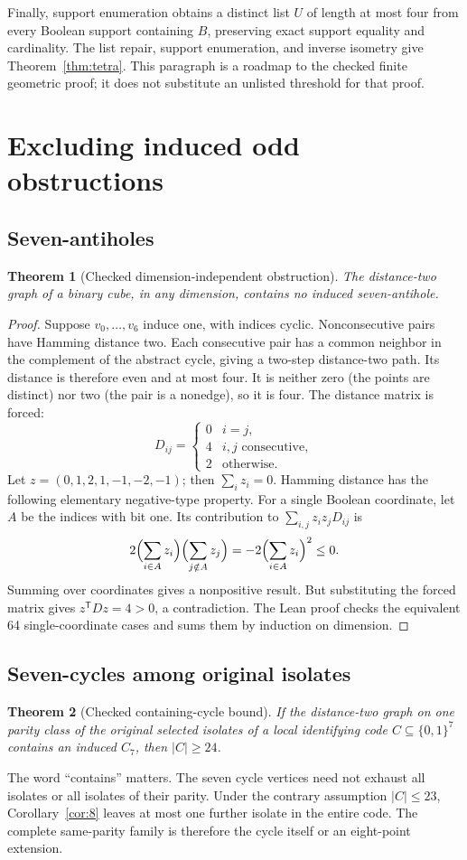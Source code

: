 \documentclass[11pt]{article}
\newtheorem{theorem}{Theorem}[section]
\theoremstyle{definition}\newtheorem{definition}[theorem]{Definition}
\theoremstyle{remark}\newtheorem{remark}[theorem]{Remark}
\newcommand{\card}[1]{\lvert #1\rvert}
\newcommand{\bits}{\{0,1\}}
\begin{document}
Finally, support enumeration obtains a distinct list $U$ of length at most four from every Boolean support containing $B$, preserving exact support equality and cardinality. The list repair, support enumeration, and inverse isometry give Theorem~\ref{thm:tetra}. This paragraph is a roadmap to the checked finite geometric proof; it does not substitute an unlisted threshold for that proof.

\section{Excluding induced odd obstructions}
\subsection{Seven-antiholes}
\begin{theorem}[Checked dimension-independent obstruction]\label{thm:anti}
The distance-two graph of a binary cube, in any dimension, contains no induced seven-antihole.
\end{theorem}
\begin{proof}
Suppose $v_0,\ldots,v_6$ induce one, with indices cyclic. Nonconsecutive pairs have Hamming distance two. Each consecutive pair has a common neighbor in the complement of the abstract cycle, giving a two-step distance-two path. Its distance is therefore even and at most four. It is neither zero (the points are distinct) nor two (the pair is a nonedge), so it is four. The distance matrix is forced:
\[
 D_{ij}=\begin{cases}0&i=j,\\4&i,j\text{ consecutive},\\2&\text{otherwise}.
 \end{cases}
\]
Let $z=(0,1,2,1,-1,-2,-1)$; then $\sum_i z_i=0$. Hamming distance has the following elementary negative-type property. For a single Boolean coordinate, let $A$ be the indices with bit one. Its contribution to $\sum_{i,j}z_i z_jD_{ij}$ is
\[
 2\Bigl(\sum_{i\in A}z_i\Bigr)\Bigl(\sum_{j\notin A}z_j\Bigr)
 =-2\Bigl(\sum_{i\in A}z_i\Bigr)^2\le0.
\]
Summing over coordinates gives a nonpositive result. But substituting the forced matrix gives $z^{\mathsf T}Dz=4>0$, a contradiction. The Lean proof checks the equivalent 64 single-coordinate cases and sums them by induction on dimension.
\end{proof}

\subsection{Seven-cycles among original isolates}
\begin{theorem}[Checked containing-cycle bound]\label{thm:c7}
If the distance-two graph on one parity class of the original selected isolates of a local identifying code $C\subseteq\bits^7$ contains an induced $C_7$, then $\card C\ge24$.
\end{theorem}
The word ``contains'' matters. The seven cycle vertices need not exhaust all isolates or all isolates of their parity. Under the contrary assumption $\card C\le23$, Corollary~\ref{cor:8} leaves at most one further isolate in the entire code. The complete same-parity family is therefore the cycle itself or an eight-point extension.
\end{document}
